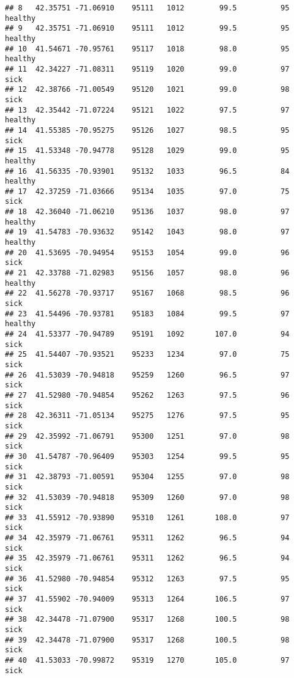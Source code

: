 \documentclass[
]{article}
\begin{document}
\begin{verbatim}
## 8   42.35751 -71.06910    95111   1012        99.5          95      healthy
## 9   42.35751 -71.06910    95111   1012        99.5          95      healthy
## 10  41.54671 -70.95761    95117   1018        98.0          95      healthy
## 11  42.34227 -71.08311    95119   1020        99.0          97         sick
## 12  42.38766 -71.00549    95120   1021        99.0          98         sick
## 13  42.35442 -71.07224    95121   1022        97.5          97      healthy
## 14  41.55385 -70.95275    95126   1027        98.5          95         sick
## 15  41.53348 -70.94778    95128   1029        99.0          95      healthy
## 16  41.56335 -70.93901    95132   1033        96.5          84      healthy
## 17  42.37259 -71.03666    95134   1035        97.0          75         sick
## 18  42.36040 -71.06210    95136   1037        98.0          97      healthy
## 19  41.54783 -70.93632    95142   1043        98.0          97      healthy
## 20  41.53695 -70.94954    95153   1054        99.0          96         sick
## 21  42.33788 -71.02983    95156   1057        98.0          96      healthy
## 22  41.56278 -70.93717    95167   1068        98.5          96         sick
## 23  41.54496 -70.93781    95183   1084        99.5          97      healthy
## 24  41.53377 -70.94789    95191   1092       107.0          94         sick
## 25  41.54407 -70.93521    95233   1234        97.0          75         sick
## 26  41.53039 -70.94818    95259   1260        96.5          97         sick
## 27  41.52980 -70.94854    95262   1263        97.5          96         sick
## 28  42.36311 -71.05134    95275   1276        97.5          95         sick
## 29  42.35992 -71.06791    95300   1251        97.0          98         sick
## 30  41.54787 -70.96409    95303   1254        99.5          95         sick
## 31  42.38793 -71.00591    95304   1255        97.0          98         sick
## 32  41.53039 -70.94818    95309   1260        97.0          98         sick
## 33  41.55912 -70.93890    95310   1261       108.0          97         sick
## 34  42.35979 -71.06761    95311   1262        96.5          94         sick
## 35  42.35979 -71.06761    95311   1262        96.5          94         sick
## 36  41.52980 -70.94854    95312   1263        97.5          95         sick
## 37  41.55902 -70.94009    95313   1264       106.5          97         sick
## 38  42.34478 -71.07900    95317   1268       100.5          98         sick
## 39  42.34478 -71.07900    95317   1268       100.5          98         sick
## 40  41.53033 -70.99872    95319   1270       105.0          97         sick

\end{verbatim}
\end{document}
